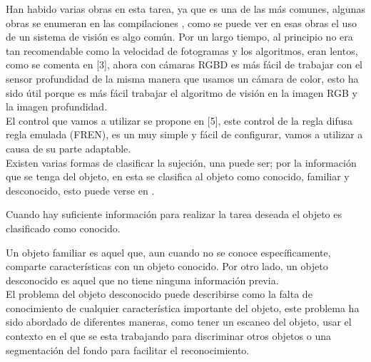 Han habido varias obras en esta tarea, ya que es una de las más comunes, algunas obras se enumeran en las compilaciones \cite{carlos2013survey}, como se puede ver en esas obras el uso de un sistema de visión es algo común. Por un largo tiempo, al principio no era tan recomendable como la velocidad de fotogramas y los algoritmos, eran lentos, como se comenta en [3], ahora con cámaras RGBD es más fácil de trabajar con el sensor profundidad de la misma manera que usamos un cámara de color, esto ha sido útil porque es más fácil trabajar el algoritmo de visión en la imagen RGB y la imagen profundidad. \\
El control que vamos a utilizar se propone en [5], este control de la regla difusa regla emulada (FREN), es un muy simple y fácil de configurar, vamos a utilizar a causa de su parte adaptable. \\

Existen varias formas de clasificar la sujeción, una puede ser; por la información que se tenga del objeto, en esta se clasifica al objeto como conocido, familiar y desconocido, esto puede verse en \cite{bohg2014data,el20113d,carlos2013survey,zaharescuobject}.

Cuando hay suficiente información para realizar la tarea deseada el objeto es clasificado como conocido.

Un objeto familiar es aquel que, aun cuando no se conoce específicamente, comparte características con un objeto conocido. Por otro lado, un objeto desconocido es aquel que no tiene ninguna información previa. \\

El problema del objeto desconocido puede describirse como la falta de conocimiento de cualquier característica importante del objeto, este problema ha sido abordado de diferentes maneras, como tener un escaneo del objeto, usar el contexto en el que se esta trabajando para discriminar otros objetos o una segmentación del fondo para facilitar el reconocimiento.

